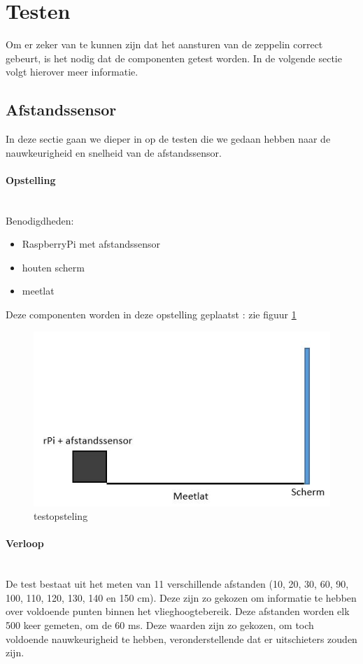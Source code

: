 \documentclass[eind]{penoverslag}
\begin{document}
\section{Testen}

Om er zeker van te kunnen zijn dat het aansturen van de zeppelin correct gebeurt, is het nodig dat de componenten getest worden. In de volgende sectie volgt hierover meer informatie. \\
\subsection{Afstandssensor}

In deze sectie gaan we dieper in op de testen die we gedaan hebben naar de nauwkeurigheid en snelheid van de afstandssensor.

\paragraph{Opstelling} ~\\ 
Benodigdheden:
\begin{itemize}
	\item RaspberryPi met afstandssensor
	\item houten scherm
	\item meetlat
\end{itemize}
Deze componenten worden in deze opstelling geplaatst : zie figuur \ref{opstelling}

\begin{figure}[ht!]%
\centering
\includegraphics[scale=0.6]{opstelling.jpg}%
\caption{testopsteling}%
\label{opstelling}%
\end{figure}

\paragraph{Verloop} ~\\ 
De test bestaat uit het meten van 11 verschillende afstanden (10, 20, 30, 60, 90, 100, 110, 120, 130, 140 en 150 cm). Deze zijn zo gekozen om informatie te hebben over voldoende punten binnen het vlieghoogtebereik. Deze afstanden worden elk 500 keer gemeten, om de 60 ms. Deze waarden zijn zo gekozen, om toch voldoende nauwkeurigheid te hebben, veronderstellende dat er uitschieters zouden zijn.
\end{document}
